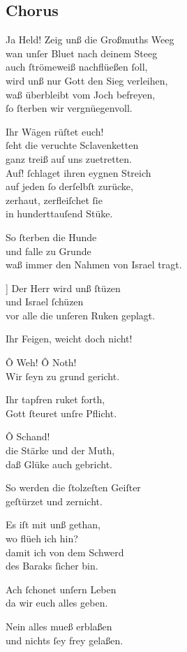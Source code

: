\documentclass{ees}
\newenvironment{lyrics}[1]{%
  \subsection{#1}\nopagebreak%
  \begin{lyricslist}%
  \let\voice\item%
}{%
  \end{lyricslist}%
}
\begin{document}
\begin{lyrics}{Chorus}
  \voice[{Chor [Israels]}]
  Ja Held! Zeig unß die Großmuths Weeg\\
  wan unſer Bluet nach deinem Steeg\\
  auch ſtrömeweiß nachflüeßen ſoll,\\
  wird unß nur Gott den Sieg verleihen,\\
  waß überbleibt vom Joch befreyen,\\
  ſo ſterben wir vergnüegenvoll.

  \voice[Sisera]
  Ihr Wägen rüſtet euch!\\
  ſeht die veruchte Sclavenketten\\
  ganz treiß auf uns zuetretten.\\
  Auf! ſchlaget ihren eygnen Streich\\
  auf jeden ſo derſelbſt zurücke,\\
  zerhaut, zerfleiſchet ſie\\
  in hunderttauſend Stüke.
  \clearpage
  \voice[Chor der Cananiter]
  So ſterben die Hunde\\
  und falle zu Grunde\\
  waß immer den Nahmen von Israel tragt.

  \voice[[Chor Israels]]
  Der Herr wird unß ſtüzen\\
  und Israel ſchüzen\\
  vor alle die unſeren Ruken geplagt.

  \voice[Sisera]
  Ihr Feigen, weicht doch nicht!

  \voice[Chor der Cananiter]
  Ô Weh! Ô Noth!\\
  Wir ſeyn zu grund gericht.

  \voice[Barak]
  Ihr tapfren ruket forth,\\
  Gott ſteuret unſre Pflicht.

  \voice[Chor der Cananiter]
  Ô Schand!\\
  die Stärke und der Muth,\\
  daß Glüke auch gebricht.

  \voice[Chor Israels]
  So werden die ſtolzeſten Geiſter\\
  geſtürzet und zernicht.

  \voice[Sisera]
  Es iſt mit unß gethan,\\
  wo flüeh ich hin?\\
  damit ich von dem Schwerd\\
  des Baraks ſicher bin.

  \voice[Cananiter Chor]
  Ach ſchonet unſern Leben\\
  da wir euch alles geben.

  \voice[Barak]
  Nein alles mueß erblaßen\\
  und nichts ſey frey gelaßen.
\end{lyrics}
\end{document}
